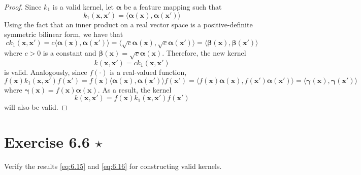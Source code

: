 \vspace{1em}

\begin{proof}
    Since $k_1$ is a valid kernel, let $\bm{\alpha}$ be
    a feature mapping such that
    \[
        k_1(\mathbf{x}, \mathbf{x}') 
        = \langle \bm{\alpha}(\mathbf{x}), \bm{\alpha}(\mathbf{x}') \rangle
    \] 
    Using the fact that an inner product on a real vector space is a 
    positive-definite symmetric bilinear form, we have that
    \[
        ck_1(\mathbf{x}, \mathbf{x}')
        = c \langle \bm{\alpha}(\mathbf{x}), \bm{\alpha}(\mathbf{x}') \rangle
        = \langle \sqrt{c} \bm{\alpha}(\mathbf{x}), \sqrt{c} \bm{\alpha}(\mathbf{x}') \rangle
        = \langle \bm{\beta}(\mathbf{x}), \bm{\beta}(\mathbf{x}') \rangle
    \] 
    where $c > 0$ is a constant and $\bm{\beta}(\mathbf{x}) = \sqrt{c}\bm{\alpha}(\mathbf{x})$.
    Therefore, the new kernel 
    \begin{equation}\label{eq:6.13}\tag{6.13}
        k(\mathbf{x}, \mathbf{x}') = ck_1(\mathbf{x}, \mathbf{x}')
    \end{equation}
    is valid. Analogously, since $f(\cdot)$ is a real-valued function, 
    \[
        f(\mathbf{x}) k_1(\mathbf{x}, \mathbf{x}') f(\mathbf{x}')
        = f(\mathbf{x}) \langle \bm{\alpha}(\mathbf{x}), \bm{\alpha}(\mathbf{x}') \rangle
        f(\mathbf{x}')
        = \langle f(\mathbf{x}) \bm{\alpha}(\mathbf{x}), f(\mathbf{x}') \bm{\alpha}(\mathbf{x}')
        \rangle
        = \langle \bm{\gamma}(\mathbf{x}), \bm{\gamma}(\mathbf{x}') \rangle
    \] 
    where $\bm{\gamma}(\mathbf{x}) = f(\mathbf{x}) \bm{\alpha}(\mathbf{x})$.
    As a result, the kernel
    \begin{equation}\label{eq:6.14}\tag{6.14}
        k(\mathbf{x}, \mathbf{x}') = f(\mathbf{x}) k_1(\mathbf{x}, \mathbf{x}') f(\mathbf{x}')
    \end{equation}
    will also be valid.
\end{proof}

\section*{Exercise 6.6 $\star$}
Verify the results \eqref{eq:6.15} and \eqref{eq:6.16} for constructing valid kernels.

\vspace{1em}

